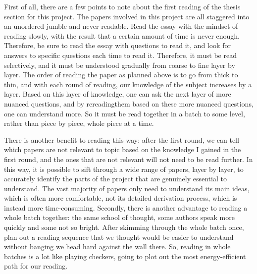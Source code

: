 \documentclass{sigchi}
\begin{document}
First of all, there are a few points to note about the first reading of the thesis section for this project. The papers involved in this project are all staggered into an unordered jumble and never readable. Read the essay with the mindset of reading slowly, with the result that a certain amount of time is never enough. Therefore, be sure to read the essay with questions to read it, and look for answers to specific questions each time to read it. Therefore, it must be read selectively, and it must be understood gradually from coarse to fine layer by layer. The order of reading the paper as planned above is to go from thick to thin, and with each round of reading, our knowledge of the subject increases by a layer. Based on this layer of knowledge, one can ask the next layer of more nuanced questions, and by rereadingthem based on these more nuanced questions, one can understand more. So it must be read together in a batch to some level, rather than piece by piece, whole piece at a time.

There is another benefit to reading this way: after the first round, we can tell which papers are not relevant to topic based on the knowledge I gained in the first round, and the ones that are not relevant will not need to be read further. In this way, it is possible to sift through a wide range of papers, layer by layer, to accurately identify the parts of the project that are genuinely essential to understand. The vast majority of papers only need to understand its main ideas, which is often more comfortable, not its detailed derivation process, which is instead more time-consuming. Secondly, there is another advantage to reading a whole batch together: the same school of thought, some authors speak more quickly and some not so bright. After skimming through the whole batch once, plan out a reading sequence that we thought would be easier to understand without banging we head hard against the wall there. So, reading in whole batches is a lot like playing checkers, going to plot out the most energy-efficient path for our reading.
\end{document}
